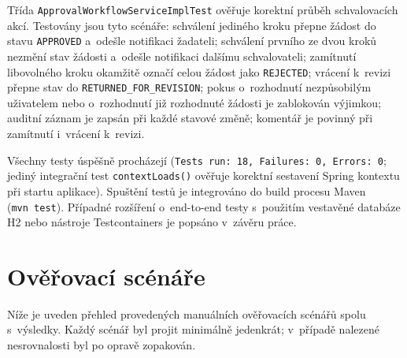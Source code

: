 Třída \texttt{ApprovalWorkflowServiceImplTest} ověřuje korektní průběh
schvalovacích akcí. Testovány jsou tyto scénáře: schválení jediného
kroku přepne žádost do stavu \texttt{APPROVED} a~odešle notifikaci
žadateli; schválení prvního ze dvou kroků nezmění stav žádosti a~odešle
notifikaci dalšímu schvalovateli; zamítnutí libovolného kroku
okamžitě označí celou žádost jako \texttt{REJECTED}; vrácení k~revizi
přepne stav do \texttt{RETURNED\_FOR\_REVISION}; pokus o~rozhodnutí
nezpůsobilým uživatelem nebo o~rozhodnutí již rozhodnuté žádosti je
zablokován výjimkou; auditní záznam je zapsán při každé stavové změně;
komentář je povinný při zamítnutí i~vrácení k~revizi.

Všechny testy úspěšně procházejí (\texttt{Tests run: 18, Failures:~0,
Errors:~0}; jediný integrační test \texttt{contextLoads()} ověřuje
korektní sestavení Spring kontextu při startu aplikace). Spuštění testů
je integrováno do build procesu Maven (\texttt{mvn~test}). Případné
rozšíření o~end-to-end testy s~použitím vestavěné databáze H2 nebo
nástroje Testcontainers je popsáno v~závěru práce.

\section{Ověřovací scénáře}

Níže je uveden přehled provedených manuálních ověřovacích scénářů
spolu s~výsledky. Každý scénář byl projit minimálně jedenkrát;
v~případě nalezené nesrovnalosti byl po opravě zopakován.

